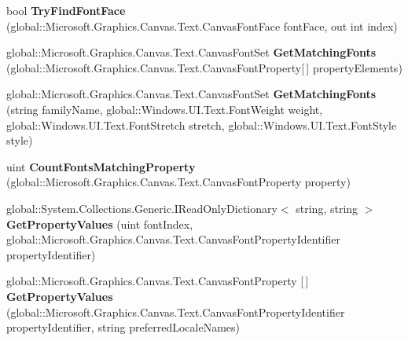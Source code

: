 \begin{DoxyCompactItemize}
bool {\bfseries Try\+Find\+Font\+Face} (global\+::\+Microsoft.\+Graphics.\+Canvas.\+Text.\+Canvas\+Font\+Face font\+Face, out int index)
\item 
\mbox{\label{class_microsoft_1_1_graphics_1_1_canvas_1_1_text_1_1_canvas_font_set_a4a5e120b147d6554e916b380746b72a5}} 
global\+::\+Microsoft.\+Graphics.\+Canvas.\+Text.\+Canvas\+Font\+Set {\bfseries Get\+Matching\+Fonts} (global\+::\+Microsoft.\+Graphics.\+Canvas.\+Text.\+Canvas\+Font\+Property\mbox{[}$\,$\mbox{]} property\+Elements)
\item 
\mbox{\label{class_microsoft_1_1_graphics_1_1_canvas_1_1_text_1_1_canvas_font_set_a1e65e79bf7c6294505e0162beef419fd}} 
global\+::\+Microsoft.\+Graphics.\+Canvas.\+Text.\+Canvas\+Font\+Set {\bfseries Get\+Matching\+Fonts} (string family\+Name, global\+::\+Windows.\+U\+I.\+Text.\+Font\+Weight weight, global\+::\+Windows.\+U\+I.\+Text.\+Font\+Stretch stretch, global\+::\+Windows.\+U\+I.\+Text.\+Font\+Style style)
\item 
\mbox{\label{class_microsoft_1_1_graphics_1_1_canvas_1_1_text_1_1_canvas_font_set_a1b220e58fc624526327b3d8faccceecf}} 
uint {\bfseries Count\+Fonts\+Matching\+Property} (global\+::\+Microsoft.\+Graphics.\+Canvas.\+Text.\+Canvas\+Font\+Property property)
\item 
\mbox{\label{class_microsoft_1_1_graphics_1_1_canvas_1_1_text_1_1_canvas_font_set_a814e7ae485933c4e7fbf68602ad588b9}} 
global\+::\+System.\+Collections.\+Generic.\+I\+Read\+Only\+Dictionary$<$ string, string $>$ {\bfseries Get\+Property\+Values} (uint font\+Index, global\+::\+Microsoft.\+Graphics.\+Canvas.\+Text.\+Canvas\+Font\+Property\+Identifier property\+Identifier)
\item 
\mbox{\label{class_microsoft_1_1_graphics_1_1_canvas_1_1_text_1_1_canvas_font_set_aa821ceb086ad0eb5aed484241b6bea7a}} 
global\+::\+Microsoft.\+Graphics.\+Canvas.\+Text.\+Canvas\+Font\+Property \mbox{[}$\,$\mbox{]} {\bfseries Get\+Property\+Values} (global\+::\+Microsoft.\+Graphics.\+Canvas.\+Text.\+Canvas\+Font\+Property\+Identifier property\+Identifier, string preferred\+Locale\+Names)

\end{DoxyCompactItemize}
